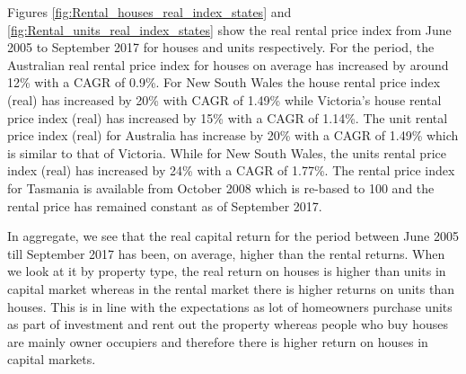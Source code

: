 \documentclass[AEJ,reqno, draftmode]{AEA}
\begin{document}
Figures \ref{fig:Rental_houses_real_index_states} and \ref{fig:Rental_units_real_index_states} show the real rental price index from June 2005 to September 2017 for houses and units respectively. For the period, the Australian real rental price index for houses on average has increased by around 12\% with a CAGR of 0.9\%. For New South Wales the house rental price index (real) has increased by 20\% with CAGR of 1.49\% while Victoria's house rental price index (real) has increased by 15\% with a CAGR of 1.14\%. The unit rental price index (real) for Australia has increase by 20\% with a CAGR of 1.49\% which is similar to that of Victoria. While for New South Wales, the units rental price index (real) has increased by 24\% with a CAGR of 1.77\%. The rental price index for Tasmania is available from October 2008 which is re-based to 100 and the rental price has remained constant as of September 2017.

In aggregate, we see that the real capital return for the period between June 2005 till September 2017 has been, on average, higher than the rental returns. When we look at it by property type, the real return on houses is higher than units in capital market whereas in the rental market there is higher returns on units than houses. This is in line with the expectations as lot of homeowners purchase units as part of investment and rent out the property whereas people who buy houses are mainly owner occupiers and therefore there is higher return on houses in capital markets.
\end{document}
